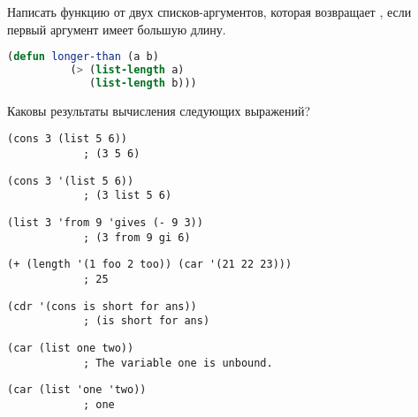 \documentclass[a4paper,oneside,12pt]{extreport}
\begin{document}
\begin{task}
	Написать функцию  от двух списков-аргументов, которая возвращает , если первый аргумент имеет большую длину.

	\begin{lstlisting}[language=Lisp, gobble=16]
		(defun longer-than (a b)
		  (> (list-length a)
		     (list-length b)))
	\end{lstlisting}
\end{task}

\begin{task}
	Каковы результаты вычисления следующих выражений?
	\begin{AutoMultiColEnumerate}
		\item \begin{lstlisting}[style=lispinline, gobble=24]
			(cons 3 (list 5 6))
			; (3 5 6)
		\end{lstlisting}

		\item \begin{lstlisting}[style=lispinline, gobble=24]
			(cons 3 '(list 5 6))
			; (3 list 5 6)
		\end{lstlisting}

		\item \begin{lstlisting}[style=lispinline, gobble=24]
			(list 3 'from 9 'gives (- 9 3))
			; (3 from 9 gi 6)
		\end{lstlisting}

		\item \begin{lstlisting}[style=lispinline, gobble=24]
			(+ (length '(1 foo 2 too)) (car '(21 22 23)))
			; 25
		\end{lstlisting}

		\item \begin{lstlisting}[style=lispinline, gobble=24]
			(cdr '(cons is short for ans))
			; (is short for ans)
		\end{lstlisting}

		\item \begin{lstlisting}[style=lispinline, gobble=24]
			(car (list one two))
			; The variable one is unbound.
		\end{lstlisting}

		\item \begin{lstlisting}[style=lispinline, gobble=24]
			(car (list 'one 'two))
			; one
		\end{lstlisting}
	\end{AutoMultiColEnumerate}
\end{task}
\end{document}
